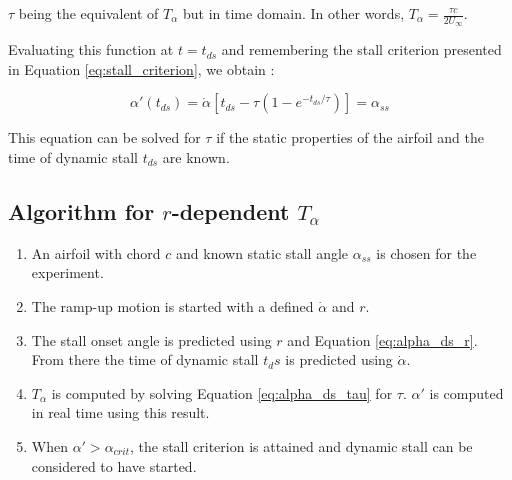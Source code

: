 \documentclass{article}
\newcommand{\alphadot}{\dot{\alpha}}
\begin{document}
\noindent $\tau$ being the equivalent of $T_\alpha$ but in time domain. In other words, $T_\alpha = \frac{\tau c}{2U_\infty}$.

Evaluating this function at $t=t_{ds}$ and remembering the stall criterion presented in Equation \eqref{eq:stall_criterion}, we obtain : 

\begin{equation}
\alpha'(t_{ds}) = \alphadot\left[t_{ds} - \tau(1-e^{-t_{ds} / \tau})\right] = \alpha_{ss}
\label{eq:alpha_ds_tau}
\end{equation}

This equation can be solved for $\tau$ if the static properties of the airfoil and the time of dynamic stall $t_{ds}$ are known.

\subsection{Algorithm for $r$-dependent $T_\alpha$}

\begin{enumerate}
\item An airfoil with chord $c$ and known static stall angle $\alpha_{ss}$ is chosen for the experiment. 
\item The ramp-up motion is started with a defined $\alphadot$ and $r$.
\item The stall onset angle is predicted using $r$ and Equation \eqref{eq:alpha_ds_r}. From there the time of dynamic stall $t_ds$ is predicted using $\alphadot$.
\item $T_\alpha$ is computed by solving Equation  \eqref{eq:alpha_ds_tau} for $\tau$. $\alpha'$ is computed in real time using this result. 
\item When $\alpha' > \alpha_{crit}$, the stall criterion is attained and dynamic stall can be considered to have started. 
\end{enumerate}
\end{document}
